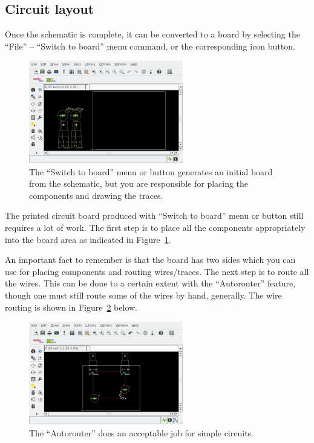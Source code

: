 \documentclass{article}
\begin{document}
\subsection{Circuit layout}
Once the schematic is complete, it can be converted to a board by selecting the ``File'' -- ``Switch to board'' menu command, or the corresponding icon button.  

\begin{figure}
\begin{center}
\includegraphics[width=0.6\textwidth]{pics/eagle_board_start}
\end{center}
\caption{The ``Switch to board'' menu or button generates an initial board from the schematic, but you are responsible for placing the components and drawing the traces.}
\label{fig:eagle:board_start}
\end{figure}

The printed circuit board produced with ``Switch to board'' menu or button still requires a lot of work. The first step is to place all the components appropriately into the board area as indicated in Figure~\ref{fig:eagle:board_start}.  

An important fact to remember is that the board has two sides which you can use for placing components and routing wires/traces. The next step is to route all the wires. This can be done to a certain extent with the ``Autorouter'' feature, though one must still route some of the wires by hand, generally. The wire routing is shown in Figure~\ref{fig:eagle:board_autorouter} below.

\begin{figure}
\begin{center}
\includegraphics[width=0.6\textwidth]{pics/eagle_board_autorouter}
\end{center}
\caption{The ``Autorouter'' does an acceptable job for simple circuits.}
\label{fig:eagle:board_autorouter}
\end{figure}
\end{document}
